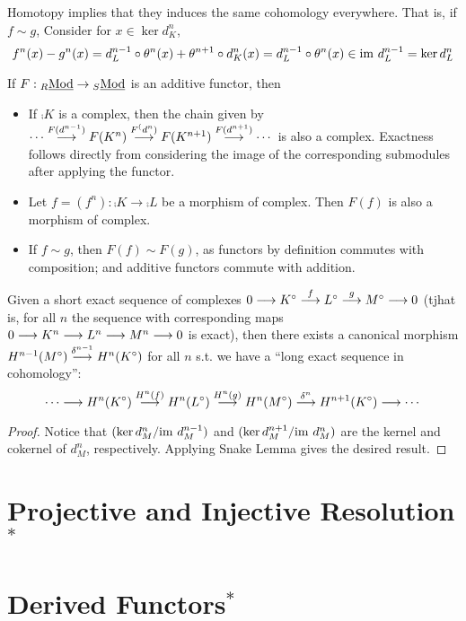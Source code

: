 \documentclass{article}
\begin{document}
\begin{remark}
    Homotopy implies that they induces the same cohomology everywhere. That is, if $f \sim g$, Consider for $x \in \ker d_K^n$,
    \[
        f^n(x) - g^n(x) = d_L^{n-1} \circ \theta^n(x) + \theta^{n+1} \circ d_K^n(x) = d_L^{n-1} \circ \theta^n(x) \in \mathrm{im}\  d_L^{n-1} = \ker d_L^n
    \]
\end{remark}

\begin{remark}
    If $F: {}_{R}\underline{\textup{Mod}} \to {}_{S}\underline{\textup{Mod}}$ is an additive functor, then
    \begin{itemize}
        \item If $\comp{K}$ is a complex, then the chain given by $\cdots \overset{F(d^{n-1})}{\longrightarrow} F(K^n) \overset{F^(d^n)}{\longrightarrow} F(K^{n+1}) \overset{F(d^{n+1})}{\longrightarrow} \cdots$ is also a complex. Exactness follows directly from considering the image of the corresponding submodules after applying the functor.
        \item Let $f = (f^n): \comp{K} \to \comp{L}$ be a morphism of complex. Then $F(f)$ is also a morphism of complex. 
        \item If $f \sim g$, then $F(f) \sim F(g)$, as functors by definition commutes with composition; and additive functors commute with addition.
    \end{itemize}
\end{remark}

\begin{proposition}
    Given a short exact sequence of complexes $0 \longrightarrow K^{\circ} \overset{f}{\longrightarrow} L^{\circ} \overset{g}{\longrightarrow} M^{\circ} \longrightarrow 0$ (tjhat is, for all $n$ the sequence with corresponding maps $0 \longrightarrow K^n \longrightarrow L^n \longrightarrow M^n \longrightarrow 0$ is exact), then there exists a canonical morphism $H^{n-1}(M^{\circ}) \overset{\delta^{n-1}}{\longrightarrow} H^n(K^{\circ})$ for all $n$ s.t. we have a ``long exact sequence in cohomology'':
    \[
        \cdots \longrightarrow H^n(K^{\circ}) \overset{H^n(f)}{\longrightarrow} H^n(L^{\circ}) \overset{H^n(g)}{\longrightarrow} H^n(M^{\circ}) \overset{\delta^n}{\longrightarrow} H^{n+1}(K^{\circ}) \longrightarrow \cdots
    \]
\end{proposition}

\begin{proof}
    Notice that $(\ker d_M^n/\mathrm{im}\  d_M^{n-1})$ and $(\ker d_M^{n+1}/\mathrm{im}\  d_M^n)$ are the kernel and cokernel of $d_M^n$, respectively. Applying Snake Lemma gives the desired result.
\end{proof}

\section{Projective and Injective Resolution$^*$}

\section{Derived Functors$^*$}
\end{document}
